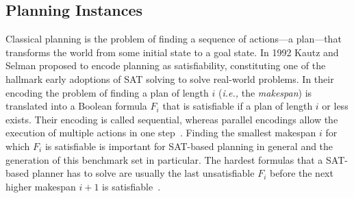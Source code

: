 \documentclass{elsarticle}
\begin{document}
\subsection{Planning Instances}
Classical planning is the problem of finding a sequence of actions---a plan---that 
transforms the world from some initial state to a goal state. In 1992 Kautz
and Selman \cite{Kautz1992} proposed to encode planning as satisfiability,
constituting one of the hallmark early adoptions of SAT solving to solve
real-world problems. In their encoding the problem of finding a plan of length
$i$ (\textit{i.e.,} the \emph{makespan}) is translated into a Boolean formula
$F_i$ that is satisfiable if a plan of length $i$ or less exists.
Their encoding is called sequential, whereas parallel encodings allow the execution
of multiple actions in one step~\cite{Rintanen2006, Rintanen2007, Balyo2013}.
Finding the smallest makespan $i$ for which $F_i$ is satisfiable is important for
SAT-based planning in general and the generation of this benchmark set in
particular.
The hardest formulas that a SAT-based planner has to solve are usually
the last unsatisfiable $F_i$ before the next higher makespan $i+1$ is
satisfiable~\cite{Rintanen2006}.
\end{document}
